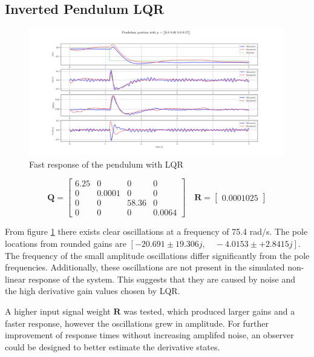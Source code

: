 \documentclass{article}
\begin{document}
\subsection{Inverted Pendulum LQR}

\begin{figure}[H]
  \centering
  \includegraphics[width=0.99\textwidth]{figures/lqr_pendulum_fast.png}
  \caption{Fast response of the pendulum with LQR}
  \label{fig:lqr_fast}
\end{figure}

\begin{equation}
  \mathbf{Q} = \left[\begin{matrix}6.25 & 0 & 0 & 0\\0 & 0.0001 & 0 & 0\\0 & 0 & 58.36 & 0\\0 & 0 & 0 & 0.0064\end{matrix}\right] \quad \mathbf{R} = \left[\begin{matrix}0.0001025\end{matrix}\right]
\end{equation}

From figure \ref{fig:lqr_fast} there exists clear oscillations at a frequency of 75.4 rad/s.
The pole locations from rounded gains are $[-20.691 \pm 19.306j, \quad -4.0153 \pm +2.8415j]$.
The frequency of the small amplitude oscillations differ significantly from the pole frequencies.
Additionally, these oscillations are not present in the simulated non-linear response of the system.
This suggests that they are caused by noise and the high derivative gain values chosen by LQR.

A higher input signal weight $\mathbf{R}$ was tested, which produced larger gains and a faster response, however the oscillations grew in amplitude.
For further improvement of response times without increasing amplifed noise, an observer could be designed to better estimate the derivative states.
\end{document}
